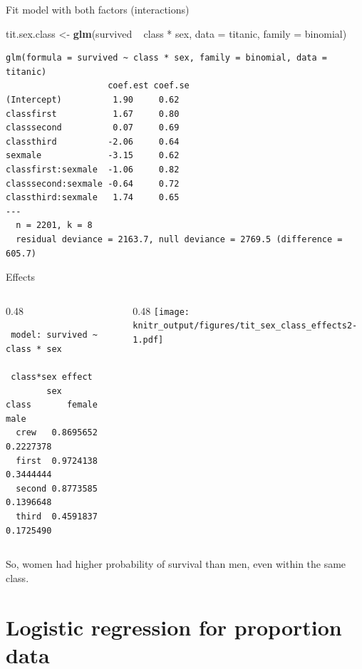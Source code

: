 \documentclass[10pt,ignorenonframetext,]{beamer}
\newenvironment{Shaded}{\begin{snugshade}}{\end{snugshade}}
\newcommand{\KeywordTok}[1]{\textcolor[rgb]{0.13,0.29,0.53}{\textbf{{#1}}}}
\newcommand{\DataTypeTok}[1]{\textcolor[rgb]{0.13,0.29,0.53}{{#1}}}
\newcommand{\StringTok}[1]{\textcolor[rgb]{0.31,0.60,0.02}{{#1}}}
\newcommand{\NormalTok}[1]{{#1}}
\def\begincols{\begin{columns}[c]}
\def\endcols{\end{columns}}
\def\begincol{\begin{column}{0.48\textwidth}}
\def\endcol{\end{column}}
\begin{document}
\begin{frame}[fragile]{Fit model with both factors (interactions)}

\begin{Shaded}
\begin{Highlighting}[]
\NormalTok{tit.sex.class <-}\StringTok{ }\KeywordTok{glm}\NormalTok{(survived ~}\StringTok{ }\NormalTok{class *}\StringTok{ }\NormalTok{sex, }\DataTypeTok{data =} \NormalTok{titanic, }\DataTypeTok{family =} \NormalTok{binomial)}
\end{Highlighting}
\end{Shaded}

\begin{verbatim}
glm(formula = survived ~ class * sex, family = binomial, data = titanic)
                    coef.est coef.se
(Intercept)          1.90     0.62  
classfirst           1.67     0.80  
classsecond          0.07     0.69  
classthird          -2.06     0.64  
sexmale             -3.15     0.62  
classfirst:sexmale  -1.06     0.82  
classsecond:sexmale -0.64     0.72  
classthird:sexmale   1.74     0.65  
---
  n = 2201, k = 8
  residual deviance = 2163.7, null deviance = 2769.5 (difference = 605.7)
\end{verbatim}

\end{frame}

\begin{frame}[fragile]{Effects}

\begincols
\begincol

\begin{verbatim}
 model: survived ~ class * sex

 class*sex effect
        sex
class       female      male
  crew   0.8695652 0.2227378
  first  0.9724138 0.3444444
  second 0.8773585 0.1396648
  third  0.4591837 0.1725490
\end{verbatim}

\endcol

\begincol
\texttt{[image: knitr\_output/figures/tit\_sex\_class\_effects2-1.pdf]}
\endcol
\endcols

So, women had higher probability of survival than men, even within the
same class.

\end{frame}

\section{Logistic regression for proportion
data}\label{logistic-regression-for-proportion-data}
\end{document}
